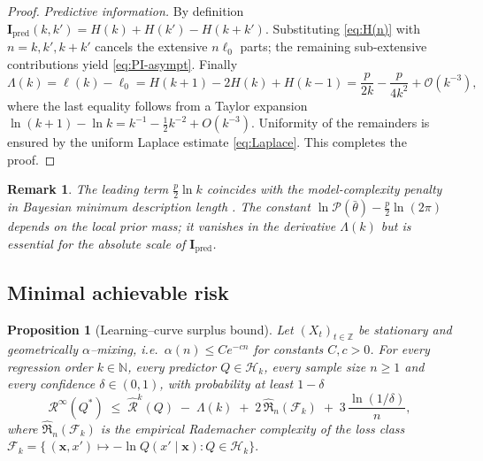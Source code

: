 \documentclass{article}
\newtheorem{proposition}[theorem]{Proposition}
\newtheorem{remark}[theorem]{Remark}
\begin{document}
\begin{proof}
\emph{Predictive information.}
By definition
$\mathbf I_{\mathrm{pred}}(k,k')=H(k)+H(k')-H(k+k')$.
Substituting \eqref{eq:H(n)} with $n=k,k',k+k'$ cancels the extensive
$n\ell_{0}$ parts; the remaining sub-extensive contributions yield
\eqref{eq:PI-asympt}.  Finally
\[
  \Lambda(k)=\ell(k)-\ell_{0}
            =H(k+1)-2H(k)+H(k-1)
            =\frac{p}{2k}-\frac{p}{4k^{2}}+\mathcal O(k^{-3}),
\]
where the last equality follows from a Taylor expansion
$\ln(k\!+\!1)-\ln k = k^{-1}-\tfrac12 k^{-2}+O(k^{-3})$.  Uniformity of the
remainders is ensured by the uniform Laplace estimate
\eqref{eq:Laplace}.  This completes the proof.
\end{proof}

\begin{remark}
The leading term $\tfrac p2\ln k$ coincides with the \emph{model-complexity
penalty} in Bayesian minimum description length
\citep{clarke1990information,barron1991minimum}.  The constant
$\ln\mathcal P(\bar\theta)-\tfrac p2\ln(2\pi)$ depends on the local prior
mass; it vanishes in the derivative $\Lambda(k)$ but is essential for the
absolute scale of $\mathbf I_{\mathrm{pred}}$.
\end{remark}


\subsection{Minimal achievable risk}

\begin{proposition}[Learning–curve surplus bound]\label{prop:B1}
Let\/ $(X_t)_{t\in\mathbb Z}$ be stationary and \emph{geometrically
$\alpha$–mixing}, i.e.\ $\alpha(n)\le C e^{-c n}$ for constants
$C,c>0$.  
For every regression order $k\in\mathbb N$, every predictor
$Q\in\mathcal H_k$, every sample size $n\ge1$ and every confidence
$\delta\in(0,1)$, with probability at least $1-\delta$
\begin{equation}\label{eq:B1-main}
   \mathcal R^{\infty}(Q^{*})
   \;\le\;
   \hat{\mathcal R}^{k}(Q)
   \;-\;\Lambda(k)
   \;+\;2\,\widehat{\Re}_n(\mathcal F_k)
   \;+\;
   3\,\frac{\ln(1/\delta)}{n},
\end{equation}
where $\widehat{\Re}_n(\mathcal F_k)$ is the empirical Rademacher
complexity of the loss class
\(
  \mathcal F_k=\bigl\{\,
      (\mathbf x,x')\mapsto -\ln Q(x'\mid\mathbf x)
      : Q\in\mathcal H_k
   \bigr\}.
\)
\end{proposition}
\end{document}
